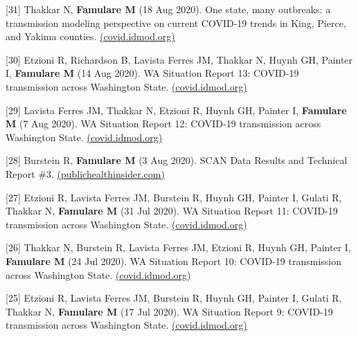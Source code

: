 \documentclass{article}
\begin{document}
\begin{llist}
\begin{items}
	\item[{[31]}] Thakkar N, \textbf{Famulare M} (18 Aug 2020). One state, many outbreaks: a transmission modeling perspective on current COVID-19 trends in King, Pierce, and Yakima counties. \href{https://iazpvnewgrp01.blob.core.windows.net/source/2021-02/reports/pdf/One_state_many_outbreaks.pdf}{(covid.idmod.org)}
	
	\item[{[30]}] Etzioni R, Richardson B, Lavista Ferres JM, Thakkar N, Huynh GH, Painter I,  \textbf{Famulare M} (14 Aug 2020). WA Situation Report 13: COVID-19 transmission across Washington State. \href{https://iazpvnewgrp01.blob.core.windows.net/source/2021-02/reports/pdf/WA_Situation_Report_13_COVID-19_transmission_across_Washington_State.pdfmission_across_Washington_State.pdf}{(covid.idmod.org)}
	
	\item[{[29]}] Lavista Ferres JM, Thakkar N, Etzioni R,  Huynh GH, Painter I, \textbf{Famulare M} (7 Aug 2020). WA Situation Report 12: COVID-19 transmission across Washington State. \href{https://iazpvnewgrp01.blob.core.windows.net/source/2021-02/reports/pdf/WA_Situation_Report_12_COVID-19_transmission_across_Washington_State.pdf}{(covid.idmod.org)}
	
	\item[{[28]}] Burstein R, \textbf{Famulare M} (3 Aug 2020). SCAN Data Results and Technical Report \#3. \href{https://publichealthinsider.com/wp-content/uploads/2020/08/8.3-SCAN-Technical-Report-3_FINAL_CLEAN.pdf}{(publichealthinsider.com)}
	
	\item[{[27]}] Etzioni R, Lavista Ferres JM, Burstein R, Huynh GH, Painter I, Gulati R, Thakkar N, \textbf{Famulare M} (31 Jul 2020). WA Situation Report 11: COVID-19 transmission across Washington State. \href{https://iazpvnewgrp01.blob.core.windows.net/source/2021-02/reports/pdf/WA_Situation_Report_11_COVID-19_transmission_across_Washington_State.pdf}{(covid.idmod.org)} 
	
	\item[{[26]}] Thakkar N, Burstein R,  Lavista Ferres JM, Etzioni R,  Huynh GH, Painter I,  \textbf{Famulare M} (24 Jul 2020). WA Situation Report 10: COVID-19 transmission across Washington State. \href{https://iazpvnewgrp01.blob.core.windows.net/source/2021-02/reports/pdf/WA_Situation_Report_10_COVID-19_transmission_across_Washington_State.pdf}{(covid.idmod.org)} 
	
	\item[{[25]}] Etzioni R, Lavista Ferres JM, Burstein R, Huynh GH, Painter I, Gulati R, Thakkar N, \textbf{Famulare M} (17 Jul 2020). WA Situation Report 9: COVID-19 transmission across Washington State. \href{https://iazpvnewgrp01.blob.core.windows.net/source/2021-02/reports/pdf/WA_Situation_Report_9_COVID-19_transmission_across_Washington_State.pdf}{(covid.idmod.org)} 
	

\end{items}
\end{llist}
\end{document}
